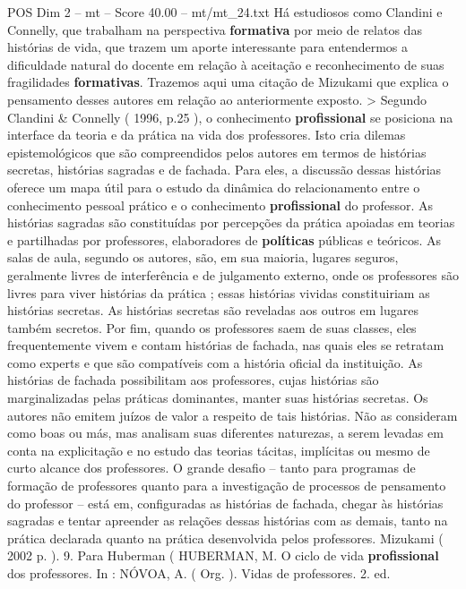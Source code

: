 \begin{textsample}{POS Dim 2 – mt – Score 40.00 – mt/mt\_24.txt}
Há estudiosos como Clandini e Connelly, que trabalham na perspectiva \textbf{formativa} por meio de relatos das histórias de vida, que trazem um aporte interessante para entendermos a dificuldade natural do docente em relação à aceitação e reconhecimento de suas fragilidades \textbf{formativas}.
Trazemos aqui uma citação de Mizukami que explica o pensamento desses autores em relação ao anteriormente exposto. > Segundo Clandini \& Connelly ( 1996, p.25 ), o conhecimento \textbf{profissional} se posiciona na interface da teoria e da prática na vida dos professores.
Isto cria dilemas epistemológicos que são compreendidos pelos autores em termos de histórias secretas, histórias sagradas e de fachada.
Para eles, a discussão dessas histórias oferece um mapa útil para o estudo da dinâmica do relacionamento entre o conhecimento pessoal prático e o conhecimento \textbf{profissional} do professor.
As histórias sagradas são constituídas por percepções da prática apoiadas em teorias e partilhadas por professores, elaboradores de \textbf{políticas} públicas e teóricos.
As salas de aula, segundo os autores, são, em sua maioria, lugares seguros, geralmente livres de interferência e de julgamento externo, onde os professores são livres para viver histórias da prática ; essas histórias vividas constituiriam as histórias secretas.
As histórias secretas são reveladas aos outros em lugares também secretos.
Por fim, quando os professores saem de suas classes, eles frequentemente vivem e contam histórias de fachada, nas quais eles se retratam como experts e que são compatíveis com a história oficial da instituição.
As histórias de fachada possibilitam aos professores, cujas histórias são marginalizadas pelas práticas dominantes, manter suas histórias secretas.
Os autores não emitem juízos de valor a respeito de tais histórias.
Não as consideram como boas ou más, mas analisam suas diferentes naturezas, a serem levadas em conta na explicitação e no estudo das teorias tácitas, implícitas ou mesmo de curto alcance dos professores.
O grande desafio – tanto para programas de formação de professores quanto para a investigação de processos de pensamento do professor – está em, configuradas as histórias de fachada, chegar às histórias sagradas e tentar apreender as relações dessas histórias com as demais, tanto na prática declarada quanto na prática desenvolvida pelos professores.
Mizukami ( 2002 p. ). 9.
Para Huberman ( HUBERMAN, M.
O ciclo de vida \textbf{profissional} dos professores.
In : NÓVOA, A. ( Org. ).
Vidas de professores. 2. ed.

\end{textsample}
